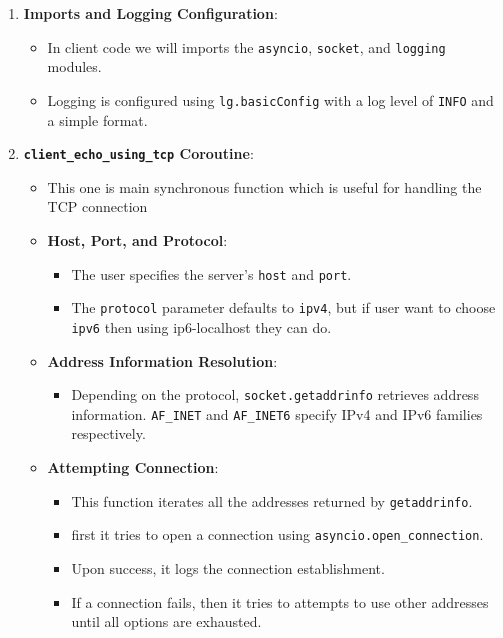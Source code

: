 \documentclass{exam}
\begin{document}
\begin{enumerate}
    \item \textbf{Imports and Logging Configuration}:
    \begin{itemize}
        \item In client code we will  imports the \texttt{asyncio}, \texttt{socket}, and \texttt{logging} modules.
        \item Logging is configured using \texttt{lg.basicConfig} with a log level of \texttt{INFO} and a simple format.
    \end{itemize}
    
    \item \textbf{\texttt{client\_echo\_using\_tcp} Coroutine}:
    \begin{itemize}
        \item 
        This one is main synchronous function which is useful for handling the TCP connection
        \item \textbf{Host, Port, and Protocol}:
        \begin{itemize}
            \item The user specifies the server's \texttt{host} and \texttt{port}.
            \item The \texttt{protocol} parameter defaults to \texttt{ipv4}, but if user want to choose   \texttt{ipv6} then using ip6-localhost they can do.
        \end{itemize}
        \item \textbf{Address Information Resolution}:
        \begin{itemize}
            \item Depending on the protocol, \texttt{socket.getaddrinfo} retrieves address information. \texttt{AF\_INET} and \texttt{AF\_INET6} specify IPv4 and IPv6 families respectively.
        \end{itemize}
        \item \textbf{Attempting Connection}:
        \begin{itemize}
            \item This function iterates all the  addresses returned by \texttt{getaddrinfo}.
            \item first it  tries to open a connection using \texttt{asyncio.open\_connection}.
            \item Upon success, it logs the connection establishment.
            \item If a connection fails, then it tries to attempts to use other addresses until all options are exhausted.
        \end{itemize}
    \end{itemize}
    

\end{enumerate}
\end{document}
